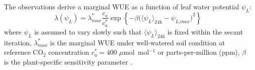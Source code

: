 The observations derive a marginal WUE as a function of leaf water potential $\psi_L$:
\begin{equation}
\lambda \left(\psi_L\right) = \lambda_{\textit{max}}^* \frac{c_a}{c_a^*}\exp \left\{-\beta \Big( \langle \psi_L \rangle_{\textit{24h}} - \psi_{\textit{L,max}}\Big)^2\right\}
\label{eq:mWUE}
\end{equation}
where $\psi_L$ is assumed to vary slowly such that $\langle \psi_L \rangle_{\textit{24h}}$ is fixed within the secant iteration, $\lambda_{max}^*$ is the marginal WUE under well-watered soil condition at reference CO$_2$ concentration $c_a^*=400$ $\mu$mol~mol$^{-1}$ or parts-per-million (ppm), $\beta$ is the plant-specific sensitivity parameter \citep{Huang2017}.

%
%
%
%
%
%
%
%

